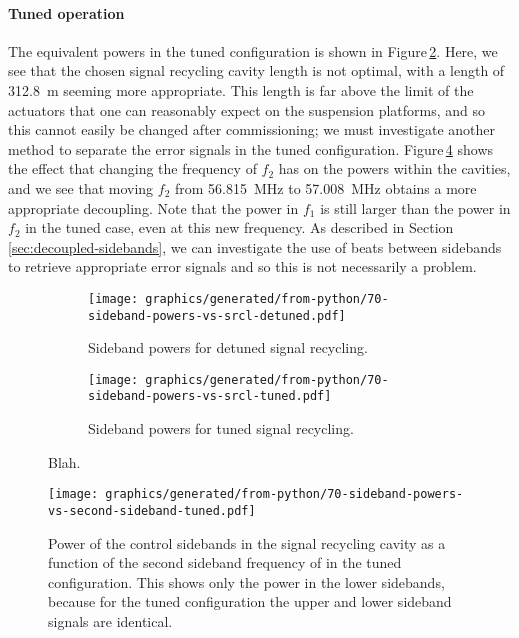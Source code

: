 \paragraph{Tuned operation}
The equivalent powers in the tuned configuration is shown in Figure\,\ref{fig:sideband-powers-srcl-tuned}. Here, we see that the chosen signal recycling cavity length is not optimal, with a length of \SI{312.8}{\meter} seeming more appropriate. This length is far above the limit of the actuators that one can reasonably expect on the suspension platforms, and so this cannot easily be changed after commissioning; we must investigate another method to separate the error signals in the tuned configuration. Figure\,\ref{fig:sideband-powers-vs-f2-tuned} shows the effect that changing the frequency of $f_2$ has on the powers within the cavities, and we see that moving $f_2$ from \SI{56.815}{\mega\hertz} to \SI{57.008}{\mega\hertz} obtains a more appropriate decoupling. Note that the power in $f_1$ is still larger than the power in $f_2$ in the tuned case, even at this new frequency. As described in Section\,\ref{sec:decoupled-sidebands}, we can investigate the use of beats between sidebands to retrieve appropriate error signals and so this is not necessarily a problem.

\begin{figure}
  \centering
  \begin{subfigure}{.49\textwidth}
    \texttt{[image: graphics/generated/from-python/70-sideband-powers-vs-srcl-detuned.pdf]}
    \caption[Power of the control sidebands in the signal recycling cavity as a function of length of \ETLF{} in the detuned configuration]{\label{fig:sideband-powers-srcl-detuned}Sideband powers for detuned signal recycling.}
  \end{subfigure}
  \hfill
  \begin{subfigure}{.49\textwidth}
    \texttt{[image: graphics/generated/from-python/70-sideband-powers-vs-srcl-tuned.pdf]}
    \caption[Power of the control sidebands in the signal recycling cavity as a function of length of \ETLF{} in the tuned configuration]{\label{fig:sideband-powers-srcl-tuned}Sideband powers for tuned signal recycling.}
  \end{subfigure}
  \caption[Power of the control sidebands in the signal recycling cavity as a function of length of \ETLF{}]{\label{fig:sideband-powers-srcl}Blah.}
\end{figure}

\begin{figure}
  \centering
  \texttt{[image: graphics/generated/from-python/70-sideband-powers-vs-second-sideband-tuned.pdf]}
  \caption[Power of the control sidebands in the signal recycling cavity as a function of the second sideband frequency of \ETLF{} in the tuned configuration]{\label{fig:sideband-powers-vs-f2-tuned}Power of the control sidebands in the signal recycling cavity as a function of the second sideband frequency of \ETLF{} in the tuned configuration. This shows only the power in the lower sidebands, because for the tuned configuration the upper and lower sideband signals are identical.}
\end{figure}

